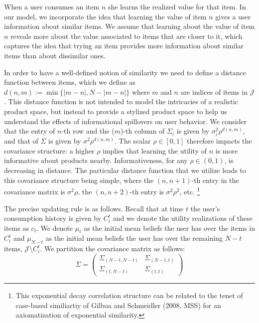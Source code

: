 \documentclass[format=acmsmall, review=false]{acmart}
\newcommand{\xhdr}[1]{\vspace{1mm} \noindent{\bf #1}}
\begin{document}
\xhdr{User Learning}
When a user consumes an item $n$ she learns the realized value for that item. In our model, we incorporate the idea that learning the value of item $n$ gives a user information about similar items. 
We assume that learning about the value of item $n$ reveals more about the value associated to items that are closer to it, which captures the idea that trying an item provides more information about similar items than about dissimilar ones.
\par
In order to have a well-defined notion of similarity we need to define a distance function between items, which we define as $d(n,m):=\min\{ \lvert m - n \rvert ,N - \lvert m - n \rvert \}$ where $m$ and $n$ are indices of items in $\mathcal{J}$. This distance function is not intended to model the intricacies of a realistic product space, but instead to provide a stylized product space to help us understand the effects of informational spillovers on user behavior. We consider that the entry of $n$-th row and the ($m$)-th column of $\Sigma_i$ is given by $\sigma_i^2 \rho^{d(n,m)}$, and that of $\Sigma$ is given by $\sigma^2 \rho^{d(n,m)}$. The scalar $\rho \in [0,1]$ therefore impacts the covariance structure: a higher $\rho$ implies that learning the utility of $n$ is more informative about products nearby. Informativeness, for any $\rho \in (0,1)$, is decreasing in distance. The particular distance function that we utilize leads to this covariance structure being simple, where the $(n,n+1)$-th entry in the covariance matrix is $\sigma^{2} \rho$, the $(n,n+2)$-th entry is $\sigma^{2} \rho^2$, etc. \footnote{This exponential decay correlation structure can be related to the tenet of case-based similiartiy of Gilboa and Schmeidler (2008, MSS) for an axiomatization of exponential similarity.}
\par
The precise updating rule is as follows. Recall that at time $t$ the user's consumption history is given by $C_{i}^{t}$ and we denote the utility realizations of these items as $c_t$. We denote $\mu_t$ as the initial mean beliefs the user has over the items in $C_{i}^{t}$ and $\mu_{N-t}$ as the initial mean beliefs the user has over the remaining $N-t$ items, $\mathcal{J} \setminus C_{i}^{t}$. We partition the covariance matrix as follows:
\[ \Sigma =  \left( \begin{array}{cc}
\Sigma_{(N-t, N-t)} & \Sigma_{(N-t,t)} \\
\Sigma_{(t,N-t)} & \Sigma_{(t,t)}
\end{array} \right)
\]
\end{document}
